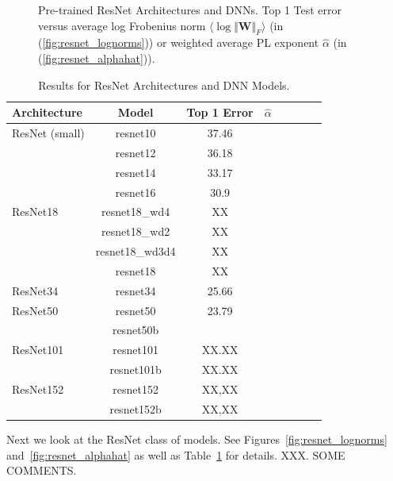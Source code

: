 \begin{figure}[!htb]
{      \label{fig:resnet_alphahat}
   }
   \caption{
      Pre-trained
      ResNet Architectures and DNNs.  
      Top 1 Test error versus
      average log Frobenius norm $\langle\log\Vert\mathbf{W}\Vert_{F}\rangle$ (in (\ref{fig:resnet_lognorms}))
      or
      weighted average PL exponent $\hat{\alpha}$ (in (\ref{fig:resnet_alphahat})).
           }
   \label{fig:resnet}
\end{figure}

\begin{table}[!htb]
\small
\begin{center}
\begin{tabular}{|p{0.75in}|c|c|c|c|c|c|c|}
\hline
Architecture 
 & Model
 & Top 1 Error & $\hat{\alpha}$ \\
\hline
ResNet (small)  & resnet10 & 37.46 & \\
& resnet12 & 36.18 & \\
& resnet14 & 33.17 & \\
& resnet16 & 30.9 & \\
\hline
ResNet18 & resnet18\_wd4 & XX & \\
& resnet18\_wd2 & XX & \\
& resnet18\_wd3d4& XX & \\
& resnet18 & XX & \\

\hline
ResNet34 & resnet34 & 25.66 & \\
\hline
ResNet50 & resnet50 & 23.79 & \\
& resnet50b &  & \\

\hline
ResNet101 & resnet101 & XX.XX & \\
& resnet101b & XX.XX & \\
\hline
ResNet152 & resnet152 & XX,XX & \\
& resnet152b & XX,XX & \\
\hline
\end{tabular}
\end{center}
\caption{Results for ResNet Architectures and DNN Models.
        }
\label{table:models_resnet}
\end{table}

Next we look at the ResNet class of models. 
See
Figures~\ref{fig:resnet_lognorms}
and~\ref{fig:resnet_alphahat}
as well as
Table~\ref{table:models_resnet}
for details.
XXX.  SOME COMMENTS.


